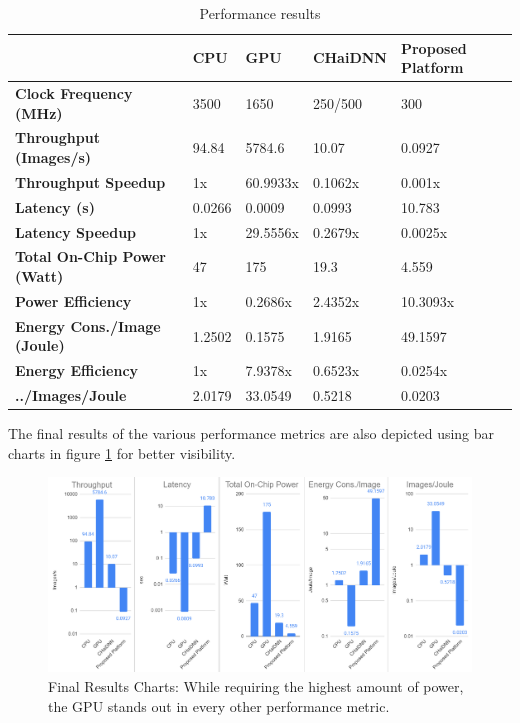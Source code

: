 \begin{table}[H]
	\caption{Performance results}
	\label{tab:Performance-results}
	\centering
	\begin{tabular}{l|l|l|l|p{2cm}}
		\toprule
		& \textbf{CPU} & \textbf{GPU} & \textbf{CHaiDNN} & \textbf{Proposed Platform}\\
		\midrule
			\textbf{Clock Frequency (MHz)} & 3500 & 1650 & 250/500 & 300\\
			\textbf{Throughput (Images/s)} & 94.84 & 5784.6 & 10.07 & 0.0927\\
			\textbf{Throughput Speedup} & 1x & 60.9933x & 0.1062x & 0.001x\\
			\textbf{Latency (s)} & 0.0266 & 0.0009 & 0.0993 & 10.783\\
			\textbf{Latency Speedup} & 1x & 29.5556x & 0.2679x & 0.0025x\\
			\textbf{Total On-Chip Power (Watt)} & 47 & 175 & 19.3 & 4.559\\
			\textbf{Power Efficiency} & 1x & 0.2686x & 2.4352x & 10.3093x\\
			\textbf{Energy Cons./Image (Joule)} & 1.2502 & 0.1575 & 1.9165 & 49.1597\\
			\textbf{Energy Efficiency} & 1x & 7.9378x & 0.6523x & 0.0254x\\
			\textbf{../Images/Joule} & 2.0179 & 33.0549 & 0.5218 & 0.0203\\
		\bottomrule
	\end{tabular}
\end{table}

The final results of the various performance metrics are also depicted using bar charts in figure \ref{fig:Final-Results-charts} for better visibility.

\begin{figure} [H]
	\centering
	\includegraphics[width=\textwidth]{../Images/Results/Final-Results-charts.png}
	\decoRule
	\caption[Final Results Charts]{Final Results Charts: While requiring the highest amount of power, the GPU stands out in every other performance metric.}
	\label{fig:Final-Results-charts}
\end{figure}

